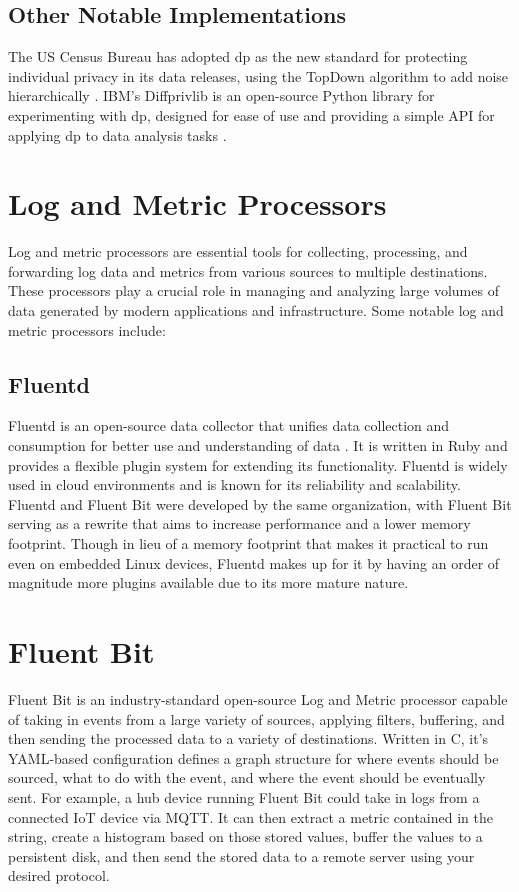 \subsection{Other Notable Implementations}
The US Census Bureau has adopted \acrshort{dp} as the new standard for protecting individual privacy in its data releases, using the TopDown algorithm to add noise hierarchically \cite{Gong2022Harnessing}. IBM's Diffprivlib is an open-source Python library for experimenting with \acrshort{dp}, designed for ease of use and providing a simple API for applying \acrshort{dp} to data analysis tasks \cite{holohan2019diffprivlib}.

\section{Log and Metric Processors}
Log and metric processors are essential tools for collecting, processing, and forwarding log data and metrics from various sources to multiple destinations. These processors play a crucial role in managing and analyzing large volumes of data generated by modern applications and infrastructure. Some notable log and metric processors include:

\subsection{Fluentd}
Fluentd is an open-source data collector that unifies data collection and consumption for better use and understanding of data \cite{fluentd}. It is written in Ruby and provides a flexible plugin system for extending its functionality. Fluentd is widely used in cloud environments and is known for its reliability and scalability. Fluentd and Fluent Bit were developed by the same organization, with Fluent Bit serving as a rewrite that aims to increase performance and a lower memory footprint. Though in lieu of a memory footprint that makes it practical to run even on embedded Linux devices, Fluentd makes up for it by having an order of magnitude more plugins available due to its more mature nature.

\section{Fluent Bit}
Fluent Bit is an industry-standard open-source Log and Metric processor capable of taking in \glspl{event} from a large variety of sources, applying filters, buffering, and then sending the processed data to a variety of destinations.\cite{What-is-Fluent-Bit} Written in C, it's YAML-based configuration defines a graph structure for where events should be sourced, what to do with the event, and where the event should be eventually sent. For example, a hub device running Fluent Bit could take in logs from a connected IoT device via MQTT. It can then extract a metric contained in the string, create a histogram based on those stored values, buffer the values to a persistent disk, and then send the stored data to a remote server using your desired protocol.

